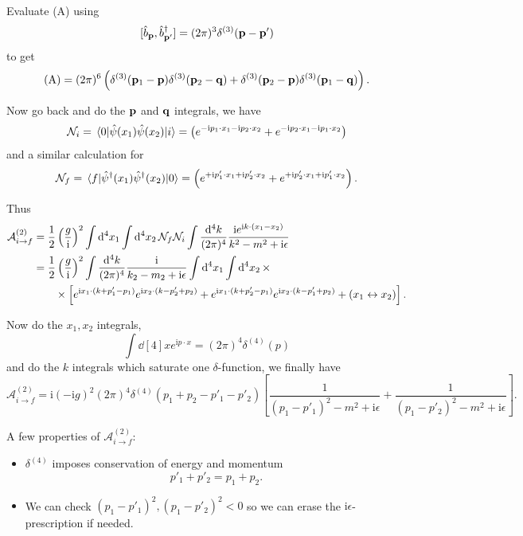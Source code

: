 \documentclass[a4paper,11pt]{article}
\begin{document}
	Evaluate (A) using
	\[
		[\hat b_{\vb p}, \hat b^{\dagger}_{\vb p'}] = (2 \pi)^3 \delta^{(3)} (\vb p - \vb p')
	\]
	to get
	\[
		\text{(A)} = (2 \pi)^6 \left( \delta ^{(3)}(\vb p_1 - \vb p) \delta ^{(3)}(\vb p_2 - \vb q) + \delta ^{(3)}(\vb p_2 - \vb p) \delta ^{(3)}(\vb p_1 - \vb q)\right).
	\]
	
	Now go back and do the $\vb p$ and $\vb q$ integrals, we have
	\[
		\mathcal{N}_i = \mel{0}{\hat \psi(x_1) \hat \psi(x_2)}{i} = \left( e ^{-\mathrm{i} p_1 \cdot x_1 - \mathrm{i} p_2 \cdot x_2} + e ^{- \mathrm{i} p_2 \cdot x_1 - \mathrm{i} p_1 \cdot x_2} \right)
	\]
	and a similar calculation for 
	\[
		\mathcal{N}_f = \mel{f}{\hat \psi^{\dagger}(x_1)\hat \psi^{\dagger}(x_2)}{0} = \left( e ^{+\mathrm{i} p'_1 \cdot x_1 + \mathrm{i} p'_2 \cdot x_2} + e ^{+ \mathrm{i} p'_2 \cdot x_1 + \mathrm{i} p'_1 \cdot x_2} \right).
	\]

	Thus
	\begin{align*}
		\mathcal{A}^{(2)}_{i \to f} & = \frac{1}{2} \left( \frac{g}{\mathrm{i}} \right)^2 \int \dd[4]{x_1} \int \dd[4]{x_2} \mathcal{N}_f \mathcal{N}_i \int \frac{\dd[4]{k}}{(2\pi)^{4}} \frac{\mathrm{i} e ^{\mathrm{i} k \cdot (x_1 - x_2)}}{k^2 - m^2 + \mathrm{i} \epsilon}\\
		& = \frac{1}{2} \left( \frac{g}{\mathrm{i}} \right)^2 \int \frac{\dd[4]{k}}{(2\pi)^{4}} \frac{\mathrm{i}}{k_2 - m_2 + \mathrm{i} \epsilon} \int \dd[4]{x_1} \int \dd[4]{x_2} \times\\
		& \qquad \times \left[ e ^{\mathrm{i}x_1 \cdot(k + p'_1 - p_1)} e ^{\mathrm{i}x_2 \cdot (k - p'_2 + p_2)} + e ^{\mathrm{i} x_1 \cdot(k + p'_2 - p_1)} e ^{\mathrm{i} x_2 \cdot (k - p'_1 + p_2)} + (x_1 \leftrightarrow x_2)\right].
	\end{align*}
	
	Now do the $x_1, x_2$ integrals,
	\[
		\int \dd[4]{x} e ^{\mathrm{i} p \cdot x} = (2 \pi)^4 \delta ^{(4)}(p)
	\]
	and do the $k$ integrals which saturate one $\delta$-function, we finally have
	\[
		\mathcal{A}^{(2)}_{i \to f} = \mathrm{i} (- \mathrm{i} g)^2 (2 \pi)^4 \delta ^{(4)}(p_1 + p_2 - p'_1 - p'_2) \left[ \frac{1}{(p_1 - p'_1)^2 - m^2 + \mathrm{i} \epsilon} + \frac{1}{(p_1 - p'_2)^2 - m^2 + \mathrm{i} \epsilon} \right].
	\]

	A few properties of $\mathcal{A}^{(2)}_{i \to f}$:
	\begin{itemize}
		\item $\delta ^{(4)}$ imposes conservation of energy and momentum \[
			p'_1 + p'_2 = p_1 + p_2.
		\]
		\item We can check $(p_1 - p'_1)^2, (p_1 - p'_2)^2 < 0$ so we can erase the $\mathrm{i} \epsilon$-prescription if needed. 
	\end{itemize}
	
\end{document}
